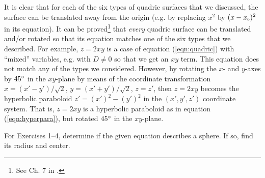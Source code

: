 It is clear that for each of the six types of quadric surfaces that we discussed, the surface can be translated away
from the origin (e.g. by replacing $x^2$ by $(x - x_{\scriptscriptstyle 0})^2$ in its equation). It can be proved\footnote{See
Ch. 7 in \cite{pog}.}
that \emph{every}
quadric surface can be translated and/or rotated so that its equation matches one of the six types that we described.
For example, $z = 2xy$ is a case of equation (\ref{eqn:quadric}) with ``mixed'' variables, e.g. with $D \ne 0$ so
that we get an $xy$ term. This equation does not match any of the types we considered. However, by rotating the $x$-
and $y$-axes by $45^\circ$ in the $xy$-plane by means of the coordinate transformation
$x = (x' - y')/\sqrt{2}$, $y = (x' + y')/\sqrt{2}$, $z = z'$, then $z = 2xy$ becomes
the hyperbolic paraboloid $z' = (x')^2 - (y')^2$ in the $(x',y',z')$ coordinate system. That is, $z = 2xy$ is a
hyperbolic paraboloid as in equation (\ref{eqn:hyperpara}), but rotated $45^\circ$ in the $xy$-plane.
\newpage
\centerline{}\label{sec1dot6}
\par\noindent For Exercises 1--4, determine if the given equation describes a sphere. If so, find its radius and
center.

